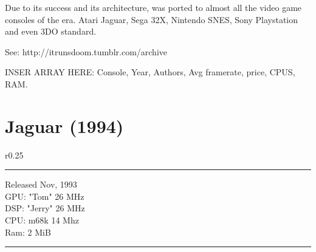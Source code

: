 Due to its success and its architecture, \doom was ported to almost all the video game consoles of the era. Atari Jaguar, Sega 32X, Nintendo SNES, Sony Playstation and even 3DO standard.\\
\par
{}
\par
See: http://itrunsdoom.tumblr.com/archive\\
\par
INSER ARRAY HERE: Console, Year, Authors, Avg framerate, price, CPUS, RAM.











\section{Jaguar (1994)}

\begin{wrapfigure}[10]{r}{0.25\textwidth}{\centering {}}
\hrule 
\bigskip
   Released Nov, 1993\\
   GPU: "Tom" 26 MHz\\
   DSP: "Jerry" 26 MHz\\
   CPU: m68k 14 Mhz\\
   Ram: 2 MiB\\
\hrule 
\end{wrapfigure}

